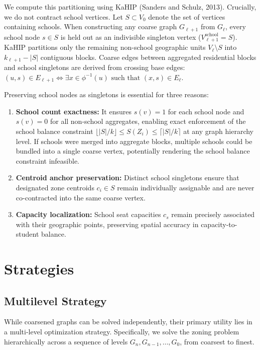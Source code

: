 \documentclass{article}
\begin{document}
We compute this partitioning using KaHIP (Sanders and Schulz, 2013). Crucially, we do not contract school vertices. Let $S \subset V_0$ denote the set of vertices containing schools. When constructing any coarse graph $G_{\ell+1}$ from $G_\ell$, every school node $s \in S$ is held out as an indivisible singleton vertex ($V_{\ell+1}^{\text{school}} = S$). KaHIP partitions only the remaining non-school geographic units $V_\ell \setminus S$ into $k_{\ell+1} - |S|$ contiguous blocks. Coarse edges between aggregated residential blocks and school singletons are derived from crossing base edges: $(u, s) \in E_{\ell+1} \iff \exists x \in \phi^{-1}(u) \text{ such that } (x, s) \in E_\ell$.

Preserving school nodes as singletons is essential for three reasons:
\begin{enumerate}
    \item \textbf{School count exactness:} It ensures $s(v) = 1$ for each school node and $s(v) = 0$ for all non-school aggregates, enabling exact enforcement of the school balance constraint $\lfloor |S|/k \rfloor \le S(Z_i) \le \lceil |S|/k \rceil$ at any graph hierarchy level. If schools were merged into aggregate blocks, multiple schools could be bundled into a single coarse vertex, potentially rendering the school balance constraint infeasible.
    \item \textbf{Centroid anchor preservation:} Distinct school singletons ensure that designated zone centroids $c_i \in S$ remain individually assignable and are never co-contracted into the same coarse vertex.
    \item \textbf{Capacity localization:} School seat capacities $c_s$ remain precisely associated with their geographic points, preserving spatial accuracy in capacity-to-student balance.
\end{enumerate}

\section{Strategies}
\subsection{Multilevel Strategy}
While coarsened graphs can be solved independently, their primary utility lies in a multi-level optimization strategy. Specifically, we solve the zoning problem hierarchically across a sequence of levels $G_n, G_{n-1}, \dots, G_0$, from coarsest to finest. 
\end{document}
